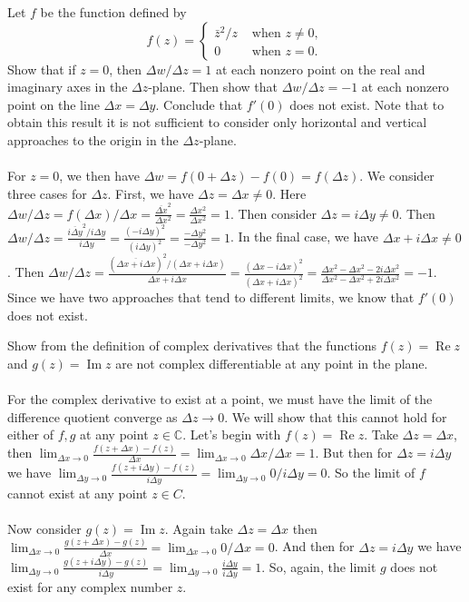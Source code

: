 \documentclass[11pt]{exam}
\newcommand{\C}{\mathbb{C}}
\DeclareMathOperator{\re}{Re}
\DeclareMathOperator{\im}{Im}
\begin{document}
\begin{questions}
\question Let $f$ be the function defined by
\[
f(z) =
\begin{cases}
  \bar{z}^2/z & \text{ when } z \ne 0, \\
  0 & \text{ when } z=0.
\end{cases}
\]
Show that if $z=0$, then $\Delta w / \Delta z = 1$ at each
nonzero point on the real and imaginary axes in the
$\Delta z$-plane. Then show that $\Delta w/ \Delta z = -1$ at
each nonzero point on the line $\Delta x = \Delta y$.
Conclude that $f'(0)$ does not exist. Note that to obtain this
result it is not sufficient to consider only horizontal and
vertical approaches to the origin in the $\Delta z$-plane. \\\\
For $z = 0$, we then have $\Delta w = f(0 + \Delta z) - f(0) = f(\Delta z)$.
We consider three cases for $\Delta z$.
First, we have $\Delta z = \Delta x \neq 0$.
Here $\Delta w / \Delta z = f(\Delta x) / \Delta x = \frac{\overline{\Delta x}^2}{\Delta x ^2} = \frac{\Delta x^2}{\Delta x ^2} = 1$.
Then consider $\Delta z = i \Delta y \neq 0$.
Then $\Delta w / \Delta z = \frac{\overline{i \Delta y}^2 / i \Delta y}{i \Delta y} = \frac{(-i \Delta y)^2}{(i \Delta y)^2} = \frac{-\Delta y^2}{- \Delta y ^2} = 1$.
In the final case, we have $\Delta x + i \Delta x \neq 0$.
Then $\Delta w / \Delta z = \frac{(\overline{\Delta x + i \Delta x})^2 / (\Delta x + i \Delta x)}{\Delta x + i \Delta x} = \frac{(\Delta x - i \Delta x)^2}{(\Delta x + i \Delta x)^2} = \frac{\Delta x ^2 - \Delta x ^2 - 2i\Delta x ^2}{\Delta x^2 - \Delta x^2 + 2i \Delta x ^2} = -1 $.
Since we have two approaches that tend to different limits, we know that $f'(0)$ does not exist.

\question Show from the definition of complex derivatives that
the functions $f(z) = \re z$ and $g(z) = \im z$ are not
complex differentiable at any point in the plane. \\\\
For the complex derivative to exist at a point, we must have the limit of the difference quotient converge as $\Delta z \to 0$.
We will show that this cannot hold for either of $f,g$ at any point $z \in \C$.
Let's begin with $f(z) = \re z$.
Take $\Delta z = \Delta x$, then $\lim _{\Delta x \to 0} \frac{f(z + \Delta x) - f(z)}{\Delta x} = \lim _{\Delta x \to 0} \Delta x / \Delta x = 1$.
But then for $\Delta z = i \Delta y$ we have $\lim _{\Delta y \to 0} \frac{f(z + i \Delta y) - f(z)}{i\Delta y} = \lim _{\Delta y \to 0} 0 / i \Delta y = 0$.
So the limit of $f$ cannot exist at any point $z \in C$. \\\\
Now consider $g(z) = \im z$.
Again take $\Delta z = \Delta x$ then $\lim _{\Delta x \to 0} \frac{g(z + \Delta x) - g(z)}{\Delta x} = \lim _{\Delta x \to 0} 0 / \Delta x = 0$.
And then for $\Delta z = i \Delta y$ we have $\lim _{\Delta y \to 0} \frac{g(z + i \Delta y) - g(z)}{i \Delta y} = \lim _{\Delta y \to 0} \frac{i \Delta y}{i \Delta y} = 1$.
So, again, the limit $g$ does not exist for any complex number $z$.


\end{questions}
\end{document}
